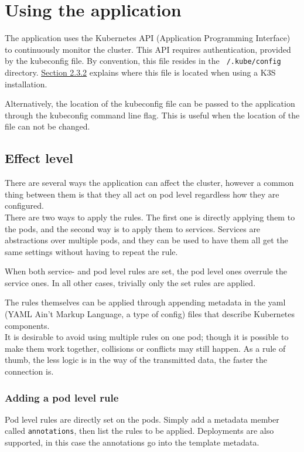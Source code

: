 \newpage
\section{Using the application}
The application uses the Kubernetes API (Application Programming Interface) to continuously monitor the cluster. This API requires authentication, provided by the kubeconfig file. By convention, this file resides in the \texttt{~/.kube/config} directory. \underline{\hyperref[sec:k3syaml]{Section 2.3.2}} explains where this file is located when using a K3S installation.

Alternatively, the location of the kubeconfig file can be passed to the application through the kubeconfig command line flag. This is useful when the location of the file can not be changed.

\subsection{Effect level}
There are several ways the application can affect the cluster, however a common thing between them is that they all act on pod level regardless how they are configured. \\

There are two ways to apply the rules. The first one is directly applying them to the pods, and the second way is to apply them to services. Services are abstractions over multiple pods, and they can be used to have them all get the same settings without having to repeat the rule.

When both service- and pod level rules are set, the pod level ones overrule the service ones. In all other cases, trivially only the set rules are applied.

The rules themselves can be applied through appending metadata in the yaml (YAML Ain't Markup Language, a type of config) files that describe Kubernetes components. \\

It is desirable to avoid using multiple rules on one pod; though it is possible to make them work together, collisions or conflicts may still happen. As a rule of thumb, the less logic is in the way of the transmitted data, the faster the connection is. 

\newpage
\subsubsection{Adding a pod level rule}
Pod level rules are directly set on the pods. Simply add a metadata member called \texttt{annotations}, then list the rules to be applied. Deployments are also supported, in this case the annotations go into the template metadata.

